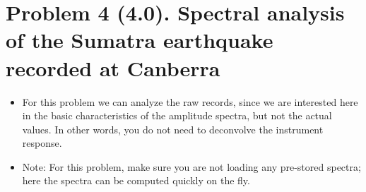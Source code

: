 \documentclass[11pt,titlepage,fleqn]{article}
\begin{document}

\section*{Problem 4 (4.0). Spectral analysis of the Sumatra earthquake recorded at Canberra}

\begin{itemize}
\item For this problem we can analyze the raw records, since we are interested here in the basic characteristics of the amplitude spectra, but not the actual values. In other words, you do not need to deconvolve the instrument response.

\item Note: For this problem, make sure you are not loading any pre-stored spectra; here the spectra can be computed quickly on the fly.
\end{itemize}
\end{document}

